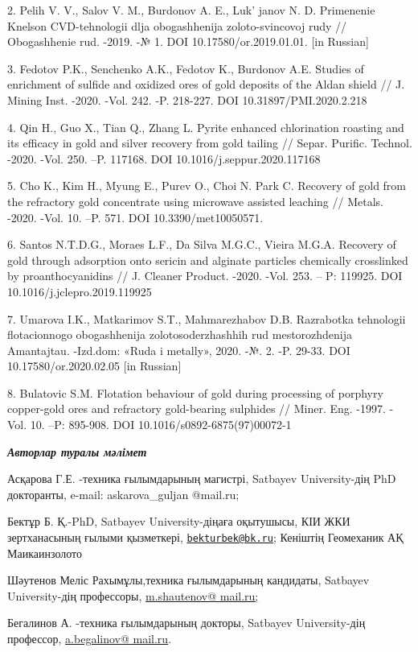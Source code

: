 2. Pelih V. V., Salov V. M., Burdonov A. E., Luk' janov
N. D. Primenenie Knelson CVD-tehnologii dlja obogashhenija
zoloto-svincovoj rudy // Obogashhenie rud. -2019. -№ 1. DOI
10.17580/or.2019.01.01. {[}in Russian{]}

3. Fedotov P.K., Senchenko A.K., Fedotov K., Burdonov A.E. Studies of
enrichment of sulfide and oxidized ores of gold deposits of the Aldan
shield // J. Mining Inst. -2020. -Vol. 242. -P. 218-227. DOI
10.31897/PMI.2020.2.218

4. Qin H., Guo X., Tian Q., Zhang L. Pyrite enhanced chlorination
roasting and its efficacy in gold and silver recovery from gold tailing
// Separ. Purific. Technol. -2020. -Vol. 250. --P. 117168. DOI
10.1016/j.seppur.2020.117168

5. Cho K., Kim H., Myung E., Purev O., Choi N. Park C. Recovery of gold
from the refractory gold concentrate using microwave assisted leaching
// Metals. -2020. -Vol. 10. --P. 571. DOI 10.3390/met10050571.

6. Santos N.T.D.G., Moraes L.F., Da Silva M.G.C., Vieira M.G.A. Recovery
of gold through adsorption onto sericin and alginate particles
chemically crosslinked by proanthocyanidins // J. Cleaner Product.
-2020. -Vol. 253. -- P: 119925. DOI 10.1016/j.jclepro.2019.119925

7. Umarova I.K., Matkarimov S.T., Mahmarezhabov D.B. Razrabotka
tehnologii flotacionnogo obogashhenija zolotosoderzhashhih rud
mestorozhdenija Amantajtau. -Izd.dom: «Ruda i metally», 2020. -№. 2. -P.
29-33. DOI 10.17580/or.2020.02.05 {[}in Russian{]}

8. Bulatovic S.M. Flotation behaviour of gold during processing of
porphyry copper-gold ores and refractory gold-bearing sulphides //
Miner. Eng. -1997. -Vol. 10. --P: 895-908. DOI
10.1016/s0892-6875(97)00072-1

\emph{{\bfseries Авторлар туралы мәлімет}}

Асқарова Г.Е. -техника ғылымдарының магистрі, Satbayev University-дің
PhD докторанты, e-mail: askarova\_guljan @mail.ru;

Бектұр Б. Қ.-PhD, Satbayev University-діңаға оқытушысы, КІИ ЖКИ
зертханасының ғылыми қызметкері,
\href{mailto:bekturbek@bk.ru}{\nolinkurl{bekturbek@bk.ru}}; Кеніштің
Геомеханик АҚ Маикаинзолото

Шәутенов Меліс Рахымұлы,техника ғылымдарының кандидаты, Satbayev
University-дің профессоры,
\href{mailto:m.shautenov@satbayev.university}{m.shautenov@ mail.ru;}

Бегалинов А. -техника ғылымдарының докторы, Satbayev University-дің
профессор, \href{mailto:a.begalinov@\%20mail.ru}{a.begalinov@ mail.ru}.

